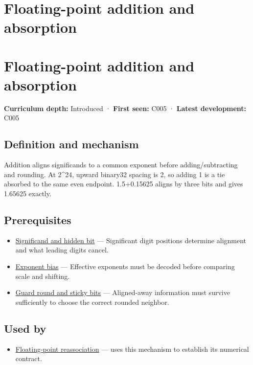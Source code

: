 \hypertarget{appendix-a1b1b4580dfd}{}
\section*{Floating-point addition and absorption}
\section{Floating-point addition and absorption}\label{floating-point-addition-and-absorption}

\textbf{Curriculum depth:} Introduced · \textbf{First seen:} C005 · \textbf{Latest development:} C005

\subsection{Definition and mechanism}\label{definition-and-mechanism}

Addition aligns significands to a common exponent before adding/subtracting and rounding. At 2\^{}24, upward binary32 spacing is 2, so adding 1 is a tie absorbed to the same even endpoint. 1.5+0.15625 aligns by three bits and gives 1.65625 exactly.

\subsection{Prerequisites}\label{prerequisites}

\begin{itemize}
\tightlist
\item
  \hyperref[appendix-a24fd710cf67]{Significand and hidden bit} --- Significant digit positions determine alignment and what leading digits cancel.
\item
  \hyperref[appendix-2fae058c82e1]{Exponent bias} --- Effective exponents must be decoded before comparing scale and shifting.
\item
  \hyperref[appendix-b572b631069b]{Guard round and sticky bits} --- Aligned-away information must survive sufficiently to choose the correct rounded neighbor.
\end{itemize}

\subsection{Used by}\label{used-by}

\begin{itemize}
\tightlist
\item
  \hyperref[appendix-c2ac4a84c283]{Floating-point reassociation} --- uses this mechanism to establish its numerical contract.
\end{itemize}

